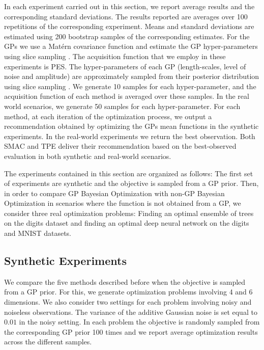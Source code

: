 In each experiment carried out in this section, we report average results and the corresponding
standard deviations. The results reported are averages over 100 repetitions of the corresponding experiment.
Means and standard deviations are estimated using 200 bootstrap samples of the corresponding estimates.
For the GPs we use a Mat\'ern covariance function and estimate
the GP hyper-parameters using slice sampling \citep{murray2010}. The acquisition function that we employ in
these experiments is PES.  The hyper-parameters of each GP
(length-scales, level of noise and amplitude) are approximately sampled from their posterior
distribution using slice sampling \citep{snoek2012practical}. We generate 10 samples for each
hyper-parameter, and the acquisition function of each method is averaged over these samples. In the real
world scenarios, we generate 50 samples for each hyper-parameter. For each method, at each iteration of the optimization
process, we output a recommendation obtained by optimizing the GPs mean functions in the synthetic experiments. In the
real-world experiments we return the best observation. Both SMAC and TPE deliver their recommendation
based on the best-observed evaluation in both synthetic and real-world scenarios.

The experiments contained in this section are organized as follows: The first set of experiments are synthetic and the
objective is sampled from a GP prior. Then, in order to compare GP Bayesian Optimization with non-GP Bayesian Optimization
in scenarios where the function is not obtained from a GP, we consider three real optimization problems: Finding an optimal
ensemble of trees on the digits dataset and finding an optimal deep neural network on the digits and MNIST datasets.

\subsection{Synthetic Experiments}

We compare the five methods described before when the objective is sampled from a GP prior. For this, we generate
optimization problems involving 4 and 6  dimensions. We also consider two settings for each problem involving noisy and
noiseless observations. The variance of the additive Gaussian noise is set equal to $0.01$ in the noisy setting.
In each problem the objective is randomly sampled from the corresponding GP prior 100 times and
we report average optimization results across the different samples.

